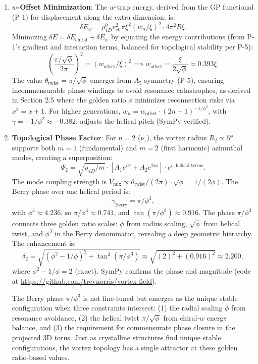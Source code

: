 \begin{enumerate}
\item \textbf{$w$-Offset Minimization}: The $w$-trap energy, derived from the GP functional (P-1) for displacement along the extra dimension, is:
   \[
   \delta E_w = \rho_{4D}^0 v_{\text{eff}}^2 \pi \xi^2 (w_n / \xi)^2 \cdot 4\pi^2 R \xi.
   \]
   Minimizing $\delta E = \delta E_{\text{chiral}} + \delta E_w$ by equating the energy contributions (from P-1's gradient and interaction terms, balanced for topological stability per P-5):
   \[
   \left( \frac{\pi / \sqrt{\phi}}{2\pi} \right)^2 = (w_{\text{offset}} / \xi)^2 \implies w_{\text{offset}} = \frac{\xi}{2 \sqrt{\phi}} \approx 0.393 \xi.
   \]
   The value $\theta_{\text{twist}} = \pi / \sqrt{\phi}$ emerges from $A_5$ symmetry (P-5), ensuring incommensurable phase windings to avoid resonance catastrophes, as derived in Section 2.5 where the golden ratio $\phi$ minimizes reconnection risks via $x^2 = x + 1$. For higher generations, $w_n = w_{\text{offset}} \cdot (2n+1)^{-1/\phi^2}$, with $\gamma = -1/\phi^2 \approx -0.382$, adjusts the helical pitch (SymPy verified).

\item \textbf{Topological Phase Factor}: For $n=2$ ($\nu_\tau$), the vortex radius $R_2 \propto 5^\phi$ supports both $m=1$ (fundamental) and $m=2$ (first harmonic) azimuthal modes, creating a superposition:
   \[
   \Psi_2 = \sqrt{\rho_{4D}/m} \cdot [A_1 e^{i\phi} + A_2 e^{2i\phi}] \cdot e^{i \cdot \text{helical terms}}.
   \]
   The mode coupling strength is $V_{\text{mix}} \propto \theta_{\text{twist}}/(2\pi) \cdot \sqrt{\phi} = 1/(2\phi)$. The Berry phase over one helical period is:
   \[
   \gamma_{\text{Berry}} = \pi / \phi^3,
   \]
   with $\phi^3 \approx 4.236$, so $\pi / \phi^3 \approx 0.741$, and $\tan(\pi / \phi^3) \approx 0.916$. The phase $\pi/\phi^3$ connects three golden ratio scales: $\phi$ from radius scaling, $\sqrt{\phi}$ from helical twist, and $\phi^3$ in the Berry denominator, revealing a deep geometric hierarchy. The enhancement is:
   \[
   \delta_2 = \sqrt{(\phi^2 - 1/\phi)^2 + \tan^2(\pi / \phi^3)} \approx \sqrt{(2)^2 + (0.916)^2} \approx 2.200,
   \]
   where $\phi^2 - 1/\phi = 2$ (exact). SymPy confirms the phase and magnitude (code at \url{https://github.com/trevnorris/vortex-field}).

   The Berry phase $\pi/\phi^3$ is not fine-tuned but emerges as the unique stable configuration when three constraints intersect: (1) the radial scaling $\phi$ from resonance avoidance, (2) the helical twist $\pi/\sqrt{\phi}$ from chiral-$w$ energy balance, and (3) the requirement for commensurate phase closure in the projected 3D torus. Just as crystalline structures find unique stable configurations, the vortex topology has a single attractor at these golden ratio-based values.


\end{enumerate}
